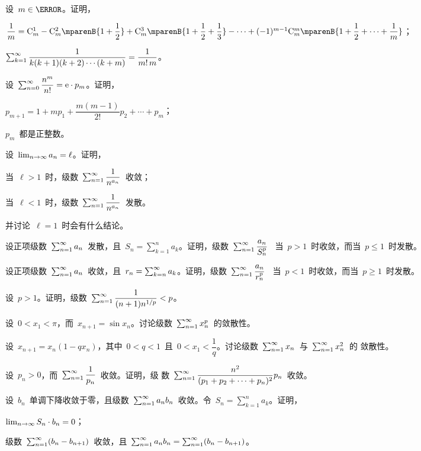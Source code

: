 \begin{exercise*}
\item 设~$m\in\mN$。证明，
\begin{exlist}
  \item $\dfrac1m=\mbinom m1-\mbinom m2\mparenB{1+\dfrac12}+\mbinom m3\mparenB{1+\dfrac12+\dfrac13}-\dotsb
          +(-1)^{m-1}\mbinom mm\mparenB{1+\dfrac12+\dotsb+\dfrac1m}$；
  \item $\sum_{k=1}^\infty\dfrac1{k(k+1)(k+2)\dotsm(k+m)}=\dfrac1{m!\,m}$。
\end{exlist}
\item 设~$\sum_{n=0}^\infty\dfrac{n^m}{n!}=\mathrm e\cdot p_m$。证明，
\begin{exlistcols}
  \item $p_{m+1}=1+mp_1+\dfrac{m(m-1)}{2!}p_2+\dotsb+p_m$；
  \item $p_m$~都是正整数。
\end{exlistcols}
\item 设~$\lim_{n\to\infty} a_n=\ell$。证明，
\begin{exlistcols}
  \item 当~$\ell>1$~时，级数~$\sum_{n=1}^\infty\dfrac1{n^{a_n}}$~收敛；
  \item 当~$\ell<1$~时，级数~$\sum_{n=1}^\infty\dfrac1{n^{a_n}}$~发散。
\end{exlistcols}
并讨论~$\ell=1$~时会有什么结论。
\item 设正项级数~$\sum_{n=1}^\infty a_n$~发散，且~$S_n=\sum_{k=1}^na_k$。证明，级数~$\sum_{n=1}^\infty\dfrac{a_n}{S_n^p}$~
当~$p>1$~时收敛，而当~$p\leq 1$~时发散。
\item 设正项级数~$\sum_{n=1}^\infty a_n$~收敛，且~$r_n=\sum_{k=n}^\infty a_k$。证明，级数~$\sum_{n=1}^\infty\dfrac{a_n}{r_n^p}$~
当~$p<1$~时收敛，而当~$p\geq 1$~时发散。
\item 设~$p>1$。证明，级数~$\sum_{n=1}^\infty\dfrac1{(n+1)n^{1\mathord{/}p}}<p$。
\item 设~$0<x_1<\pi$，而~$x_{n+1}=\sin x_n$。讨论级数~$\sum_{n=1}^\infty x_n^p$~的敛散性。
\item 设~$x_{n+1}=x_n(1-qx_n)$，其中~$0<q<1$~且~$0<x_1<\dfrac1q$。讨论级数~$\sum_{n=1}^\infty x_n$~与~$\sum_{n=1}^\infty x_n^2$~的
敛散性。
\item 设~$p_n>0$，而~$\sum_{n=1}^\infty\dfrac1{p_n}$~收敛。证明，级
数~$\sum_{n=1}^\infty\dfrac{n^2}{(p_1+p_2+\dotsb+p_n)^2}p_n$~收敛。
\item 设~$b_n$~单调下降收敛于零，且级数~$\sum_{n=1}^\infty a_nb_n$~收敛。令~$S_n=\sum_{k=1}^na_k$。证明，
\begin{exlist}
  \item $\lim_{n\to\infty} S_n\cdot b_n=0$；
  \item 级数~$\sum_{n=1}^\infty(b_n-b_{n+1})$~收敛，且~$\sum_{n=1}^\infty a_nb_n=\sum_{n=1}^\infty(b_n-b_{n+1})$。
\end{exlist}
\end{exercise*}




\endinput
